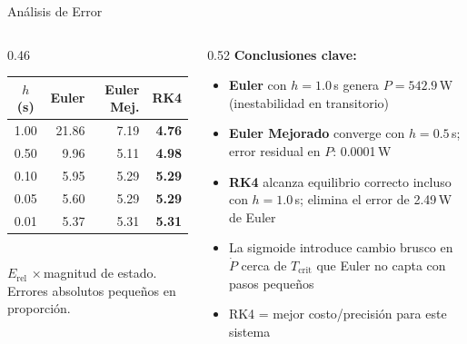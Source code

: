 \documentclass[aspectratio=169, 10pt]{beamer}
\newcommand{\tcrit}{T_{\text{crit}}}
\begin{document}
\begin{frame}{Análisis de Error}
  \begin{columns}[c]
    \begin{column}{0.46\textwidth}
      \small
      \begin{tabular}{@{}crrr@{}}
        \toprule
        \textcolor{accent}{$h$ (s)} & \textcolor{accent}{Euler}
          & \textcolor{accent}{Euler Mej.} & \textcolor{accent}{RK4} \\
        \midrule
        1.00 & \textcolor{bad}{21.86} & 7.19  & \textbf{4.76} \\
        0.50 & \textcolor{bad}{9.96}  & 5.11  & \textbf{4.98} \\
        0.10 & 5.95                   & 5.29  & \textbf{5.29} \\
        0.05 & 5.60                   & 5.29  & \textbf{5.29} \\
        0.01 & 5.37                   & 5.31  & \textbf{5.31} \\
        \bottomrule
      \end{tabular}\\[4pt]
      \scriptsize $E_\text{rel}$ ×\,magnitud de estado.
      Errores absolutos pequeños en proporción.
    \end{column}
    \begin{column}{0.52\textwidth}
      \small\textbf{Conclusiones clave:}
      \begin{itemize}\setlength\itemsep{4pt}
        \item \textbf{Euler} con $h=1.0$\,s genera $P=542.9$\,W
              (inestabilidad en transitorio)
        \item \textbf{Euler Mejorado} converge con $h=0.5$\,s;
              error residual en $P$: 0.0001\,W
        \item \textbf{RK4} alcanza equilibrio correcto incluso con
              $h=1.0$\,s; elimina el error de 2.49\,W de Euler
        \item La sigmoide introduce cambio brusco en $\dot{P}$
              cerca de $\tcrit$ que Euler no capta con pasos pequeños
        \item RK4 = mejor costo/precisión para este sistema
      \end{itemize}
    \end{column}
  \end{columns}
\end{frame}
\end{document}
